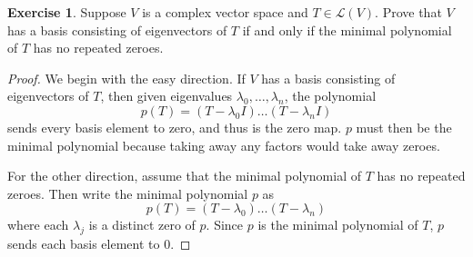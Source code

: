 \documentclass{article}
\theoremstyle{definition}
\newtheorem{ex}{Exercise}
\begin{document}
\setcounter{ex}{11}

\begin{ex}
  Suppose $V$ is a complex vector space and $T \in \mathcal{L}(V)$. Prove that $V$ has a basis consisting of eigenvectors of $T$ if and only if the minimal polynomial of $T$ has no repeated zeroes.
\end{ex}
\begin{proof}
  We begin with the easy direction.
  If $V$ has a basis consisting of eigenvectors of $T$, then given eigenvalues $\lambda_0, \dots, \lambda_n$, the polynomial \begin{equation*}
    p(T) = (T-\lambda_0I)\dots(T-\lambda_nI)
  \end{equation*} sends every basis element to zero, and thus is the zero map.
  $p$ must then be the minimal polynomial because taking away any factors would take away zeroes.

  For the other direction, assume that the minimal polynomial of $T$ has no repeated zeroes.
  Then write the minimal polynomial $p$ as \begin{equation*}
    p(T) = (T-\lambda_0)\dots(T-\lambda_n)
  \end{equation*} where each $\lambda_j$ is a distinct zero of $p$.
  Since $p$ is the minimal polynomial of $T$, $p$ sends each basis element to 0.
\end{proof}
\end{document}
